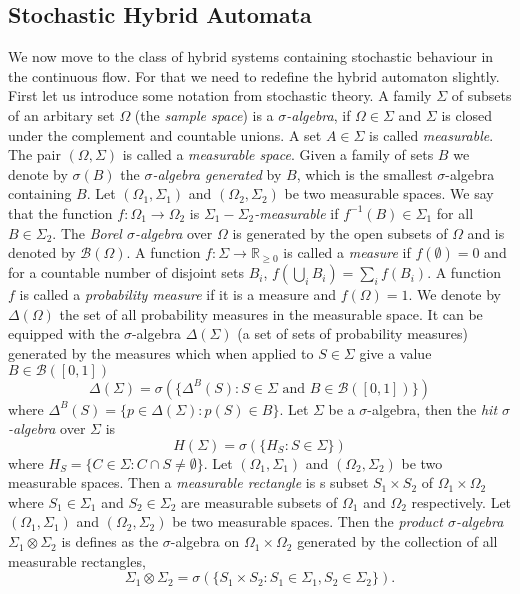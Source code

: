 \subsection{Stochastic Hybrid Automata}
\label{sec:sha}
We now move to the class of hybrid systems containing stochastic behaviour in the continuous flow. For that we need to redefine the hybrid automaton slightly. First let us introduce some notation from stochastic theory.
A family $\Sigma$ of subsets of an arbitary set $\Omega$ (the \emph{sample space}) is a \emph{$\sigma$-algebra}, if $\Omega\in\Sigma$ and $\Sigma$ is closed under the complement and countable unions.
A set $A\in\Sigma$ is called \emph{measurable}.
The pair $(\Omega,\Sigma)$ is called a \emph{measurable space}.
Given a family of sets $B$ we denote by $\sigma(B)$ the \emph{$\sigma$-algebra generated} by $B$, which is the smallest $\sigma$-algebra containing $B$.
Let $(\Omega_{1},\Sigma_{1})$ and $(\Omega_{2},\Sigma_{2})$ be two measurable spaces. We say that the function $f:\Omega_{1}\rightarrow\Omega_{2}$ is \emph{$\Sigma_{1}-\Sigma_{2}$-measurable} if $f^{-1}(B)\in\Sigma_{1}$ for all $B\in\Sigma_{2}$.
The \emph{Borel $\sigma$-algebra} over $\Omega$ is generated by the open subsets of $\Omega$ and is denoted by $\mathcal{B}(\Omega)$.
A function $f:\Sigma\rightarrow\mathbb{R}_{\geq0}$ is called a \emph{measure} if $f(\emptyset)=0$ and for a countable number of disjoint sets $B_{i}$, $f(\bigcup_{i}B_{i}) = \sum_{i}f(B_{i})$.
A function $f$ is called a \emph{probability measure} if it is a measure and $f(\Omega)=1$.
We denote by $\Delta(\Omega)$ the set of all probability measures in the measurable space. It can be equipped with the $\sigma$-algebra $\Delta(\Sigma)$ (a set of sets of probability measures)  generated by the measures which when applied to $S\in\Sigma$ give a value $B\in\mathcal{B}([0,1])$
\[
\Delta(\Sigma) = \sigma(\{\Delta^{B}(S): S\in\Sigma\text{ and } B\in\mathcal{B}([0,1])\})
\]
where $\Delta^{B}(S)=\{p\in\Delta(\Sigma):p(S)\in B\}$.
Let $\Sigma$ be a $\sigma$-algebra, then the \emph{hit $\sigma$-algebra} over $\Sigma$ is
\[
H(\Sigma) = \sigma(\{H_{S} : S\in\Sigma\})
\]
where $H_{S} = \{ C\in \Sigma : C\cap S \neq \emptyset\}$.
Let $(\Omega_{1},\Sigma_{1})$ and $(\Omega_{2},\Sigma_{2})$ be two measurable spaces. Then a \emph{measurable rectangle} is s subset $S_{1}\times S_{2}$ of $\Omega_{1}\times\Omega_{2}$ where
 $S_{1}\in\Sigma_{1}$ and $S_{2}\in\Sigma_{2}$ are measurable subsets of $\Omega_{1}$ and $\Omega_{2}$ respectively.
Let $(\Omega_{1},\Sigma_{1})$ and $(\Omega_{2},\Sigma_{2})$ be two measurable spaces. Then the \emph{product $\sigma$-algebra} $\Sigma_{1}\otimes\Sigma_{2}$ is defines as the $\sigma$-algebra on $\Omega_{1}\times\Omega_{2}$ generated by the collection of all measurable rectangles,
\[
\Sigma_{1}\otimes\Sigma_{2} = \sigma(\{S_{1}\times S_{2} : S_{1}\in\Sigma_{1}, S_{2}\in\Sigma_{2}\}).
\]

